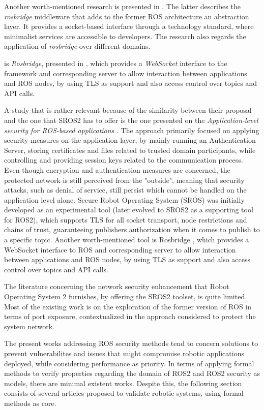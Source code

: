 Another worth-mentioned research is presented in . The latter describes the \textit{rosbridge} middleware that adds to the former ROS architecture an abstraction layer. It provides a socket-based interface through a technology standard, where minimalist services are accessible to developers. The research also regards the application of \textit{rosbridge} over different domains.

is \textit{Rosbridge}, presented in , which provides a \textit{WebSocket} interface to the framework and corresponding server to allow interaction between applications and ROS nodes, by using TLS as support and also access control over topics and API calls. 

A study that is rather relevant because of the similarity between their proposal and the one that SROS2 has to offer is the one presented on the \textit{Application-level security for ROS-based applications} \cite{application-security-ros}. The approach primarily focused on applying security measures on the application layer, by mainly running an Authentication Server, storing certificates and files related to trusted domain participants, while controlling and providing session keys related to the communication process. Even though encryption and authentication measures are concerned, the protected network is still perceived from the "outside", meaning that security attacks, such as denial of service, still persist which cannot be handled on the application level alone. Secure Robot Operating System (SROS) \cite{white2016sros} was initially developed as an experimental tool (later evolved to SROS2 as a supporting tool for ROS2), which supports TLS for all socket transport, node restrictions and chains of trust, guaranteeing publishers authorization when it comes to publish to a specific topic. Another worth-mentioned tool is Rosbridge \cite{crick2017rosbridge}, which provides a WebSocket interface to ROS and corresponding server to allow interaction between applications and ROS nodes, by using TLS as support and also access control over topics and API calls. 


The literature concerning the network security enhancement that Robot Operating System 2 furnishes, by offering the SROS2 toolset, is quite limited. Most of the existing work is on the exploration of the former version of ROS in terms of port exposure, contextualized in the approach considered to protect the system network.  


The present works addressing ROS security methods tend to concern solutions to prevent vulnerabilites and issues that might compromise robotic applications deployed, while considering performance as priority. In terms of applying formal methods to verify properties regarding the domain of ROS2 and ROS2 security as models, there are minimal existent works. Despite this, the following section consists of several articles proposed to validate robotic systems, using formal methods as core.


